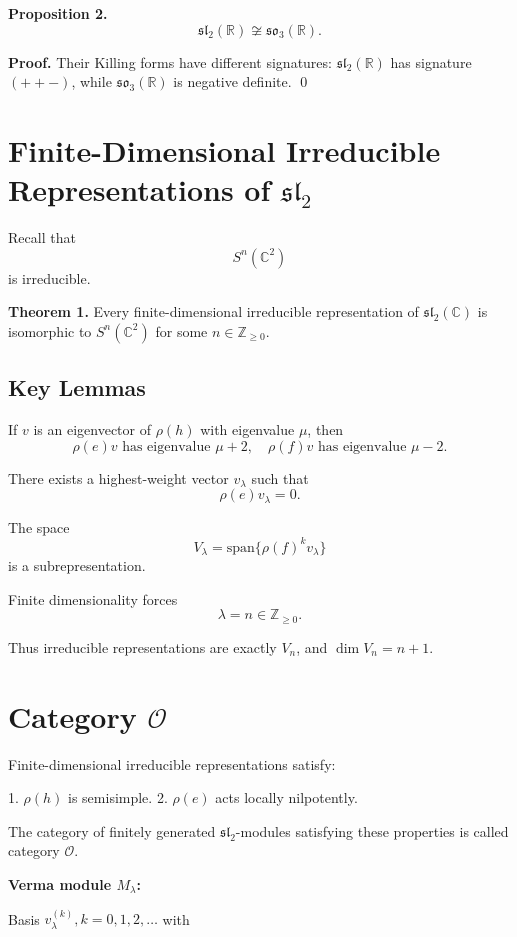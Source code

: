 \textbf{Proposition 2.}
\[
\mathfrak{sl}_2(\mathbb{R}) \not\cong \mathfrak{so}_3(\mathbb{R}).
\]

\textbf{Proof.}
Their Killing forms have different signatures:
$\mathfrak{sl}_2(\mathbb{R})$ has signature $(++-)$,
while $\mathfrak{so}_3(\mathbb{R})$ is negative definite.
\qed

\section*{Finite-Dimensional Irreducible Representations of $\mathfrak{sl}_2$}

Recall that
\[
S^n(\mathbb{C}^2)
\]
is irreducible.

\textbf{Theorem 1.}
Every finite-dimensional irreducible representation of
$\mathfrak{sl}_2(\mathbb{C})$ is isomorphic to $S^n(\mathbb{C}^2)$
for some $n\in\mathbb{Z}_{\ge0}$.

\subsection*{Key Lemmas}

If $v$ is an eigenvector of $\rho(h)$ with eigenvalue $\mu$, then
\[
\rho(e)v \text{ has eigenvalue } \mu+2,
\quad
\rho(f)v \text{ has eigenvalue } \mu-2.
\]

There exists a highest-weight vector $v_\lambda$ such that
\[
\rho(e)v_\lambda=0.
\]

The space
\[
V_\lambda = \mathrm{span}\{ \rho(f)^k v_\lambda \}
\]
is a subrepresentation.

Finite dimensionality forces
\[
\lambda = n\in \mathbb{Z}_{\ge0}.
\]

Thus irreducible representations are exactly $V_n$,
and $\dim V_n=n+1$.

\section*{Category $\mathcal{O}$}

Finite-dimensional irreducible representations satisfy:

1. $\rho(h)$ is semisimple.  
2. $\rho(e)$ acts locally nilpotently.

The category of finitely generated $\mathfrak{sl}_2$-modules satisfying these properties
is called category $\mathcal{O}$.

\textbf{Verma module $M_\lambda$:}

Basis $v_\lambda^{(k)}, k=0,1,2,\dots$ with

